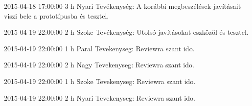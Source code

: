 \begin{naplo}
            \bejegyzes
{2015-04-18 17:00:00}
            {3 h}
            {Nyari}
            {Tevékenység: A korábbi megbeszélések javításait viszi bele a prototípusba és tesztel.}

            \bejegyzes
{2015-04-19 22:00:00}
            {2 h}
            {Szoke}
            {Tevékenység: Utolsó javításokat eszközöl és tesztel.}

            \bejegyzes
{2015-04-19 22:00:00}
            {1 h}
            {Paral}
            {Tevekenyseg: Reviewra szant ido.}

            \bejegyzes
{2015-04-19 22:00:00}
            {2 h}
            {Nagy}
            {Tevekenyseg: Reviewra szant ido.}

            \bejegyzes
{2015-04-19 22:00:00}
            {1 h}
            {Szoke}
            {Tevekenyseg: Reviewra szant ido.}

            \bejegyzes
{2015-04-19 22:00:00}
            {2 h}
            {Nyari}
            {Tevekenyseg: Reviewra szant ido.}
\end{naplo}

